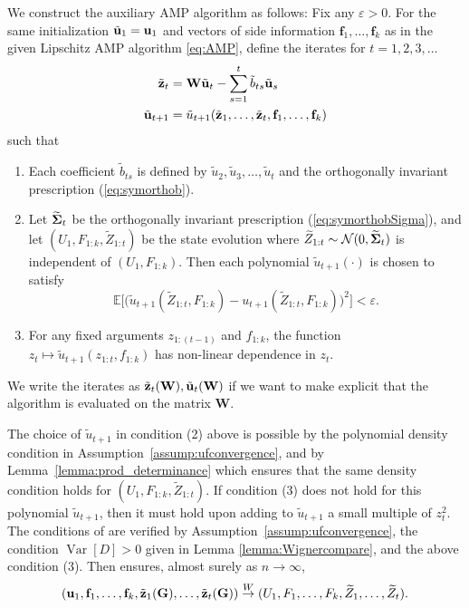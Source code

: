 \documentclass[10pt,reqno]{amsart}
\def\u{\mathbf{u}}
\def\z{\mathbf{z}}
\def\f{\mathbf{f}}
\def\G{\mathbf{G}}
\def\E{\mathbb{E}}
\def\Var{\operatorname{Var}}
\def\Normal{\mathcal{N}}
\def\toW{\overset{W}{\to}}
\def\bW{{\mathbf{W}}}
\def\eps{\varepsilon}
\begin{document}
We construct the auxiliary AMP algorithm as follows: Fix any $\eps>0$.
For the same initialization $\tilde {\mathbf{u}}_1 = \mathbf{u}_1$ and vectors of side 
information $\mathbf{f}_1, \ldots, \mathbf{f}_k$ as in the given Lipschitz AMP 
algorithm \eqref{eq:AMP}, define the iterates for $t=1,2,3,\ldots$
\begin{align}
\begin{aligned}\label{eq:aux_AMP_sym}
\tilde\zb_t &= \bW \tilde \ub_t - \sum_{s=1}^t \tilde b_{ts} \tilde \ub_s\\
\tilde\ub_{t+1} &= \tilde{u}_{t+1}(\tilde\zb_1, \ldots, \tilde\zb_t, 
\fb_1, \ldots, \fb_k)
\end{aligned}
\end{align}
such that
\begin{enumerate}
\item Each coefficient $\tilde{b}_{ts}$ is defined by $\tilde u_2,\tilde
u_3,\ldots,\tilde u_t$
and the orthogonally invariant prescription (\ref{eq:symorthob}).
\item Let $\widetilde{\bm{\Sigma}}_t$ be the orthogonally invariant
prescription (\ref{eq:symorthobSigma}), and let
$(U_1,F_{1:k},\widetilde{Z}_{1:t})$ be the state evolution where 
$\widetilde{Z}_{1:t} \sim \Normal(0,\widetilde{\bSigma}_t)$ is independent of
$(U_1,F_{1:k})$. 
Then each polynomial $\tilde u_{t+1}(\cdot)$ is chosen to satisfy
\begin{equation}\label{eq:polyapprox}
\E\big[\big(\tilde u_{t+1}(\widetilde{Z}_{1:t},F_{1:k})
-u_{t+1}(\widetilde{Z}_{1:t},F_{1:k})\big)^2\big]<\eps.
\end{equation}
\item For any fixed arguments $z_{1:(t-1)}$ and $f_{1:k}$, the function $z_t
\mapsto \tilde u_{t+1}(z_{1:t},f_{1:k})$ has non-linear dependence in $z_t$.
\end{enumerate}
We write the iterates as $\tilde\zb_t(\bW), \tilde\ub_t(\bW)$ if we want to 
make explicit that the algorithm is evaluated on the matrix $\bW$.

The choice of $\tilde u_{t+1}$ in condition (2) above is possible by the
polynomial density condition in Assumption~\ref{assump:ufconvergence}, and by 
Lemma~\ref{lemma:prod_determinance} which
ensures that the same density condition holds for 
$(U_1,F_{1:k},\widetilde{Z}_{1:t})$.
If condition (3) does not hold for this polynomial $\tilde u_{t+1}$, then it 
must hold upon adding to $\tilde u_{t+1}$ a small multiple of $z_t^2$. 
The conditions of \cite[Assumption 4.2]{fan2022approximate} are verified by 
Assumption~\ref{assump:ufconvergence}, the condition $\Var[D]>0$ given
in Lemma \ref{lemma:Wignercompare}, and the above condition (3). Then
\cite[Theorem 4.3]{fan2022approximate} ensures, almost surely as $n \to \infty$,
\begin{equation}\label{eq:Gstateevolution}
(\u_1,\f_1, \ldots, \fb_k,\tilde{\z}_1(\G), \ldots, \tilde\zb_t(\bG)) \toW 
(U_1,F_1, \ldots, F_k,\widetilde{Z}_1, \ldots, \widetilde Z_t).
\end{equation}
\end{document}
